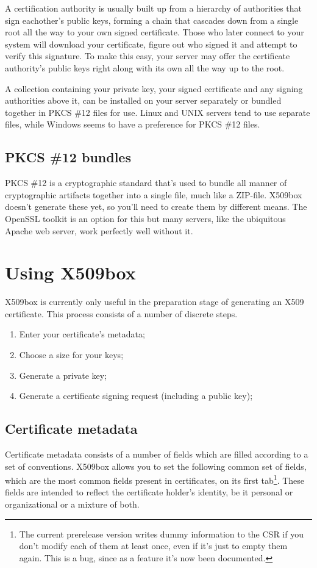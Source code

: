 \documentclass[a4paper,12pt]{article}
\begin{document}
A certification authority is usually built up from a hierarchy of authorities that sign eachother's public keys, forming a chain that cascades down from a single root all the way to your own signed certificate. Those who later connect to your system will download your certificate, figure out who signed it and attempt to verify this signature. To make this easy, your server may offer the certificate authority's public keys right along with its own all the way up to the root.

A collection containing your private key, your signed certificate and any signing authorities above it, can be installed on your server separately or bundled together in PKCS \#12 files for use. Linux and UNIX servers tend to use separate files, while Windows seems to have a preference for PKCS \#12 files.

\subsection{PKCS \#12 bundles}
PKCS \#12 is a cryptographic standard that's used to bundle all manner of cryptographic artifacts together into a single file, much like a ZIP-file. X509box doesn't generate these yet, so you'll need to create them by different means. The OpenSSL toolkit is an option for this but many servers, like the ubiquitous Apache web server, work perfectly well without it.

\section{Using X509box}
X509box is currently only useful in the preparation stage of generating an X509 certificate. This process consists of a number of discrete steps.

\begin{enumerate}
\item Enter your certificate's metadata;
\item Choose a size for your keys;
\item Generate a private key;
\item Generate a certificate signing request (including a public key);
\end{enumerate}

\subsection{Certificate metadata}
Certificate metadata consists of a number of fields which are filled according to a set of conventions. X509box allows you to set the following common set of fields, which are the most common fields present in certificates, on its first tab\footnote{The current prerelease version writes dummy information to the CSR if you don't modify each of them at least once, even if it's just to empty them again. This is a bug, since as a feature it's now been documented.}. These fields are intended to reflect the certificate holder's identity, be it personal or organizational or a mixture of both.
\end{document}

